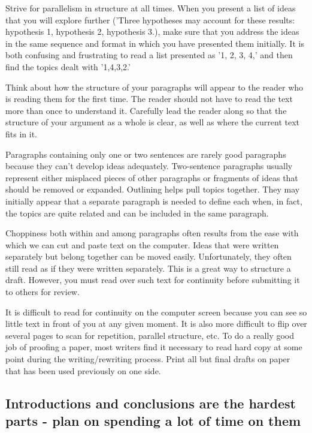 \documentclass[11pt]{article}
\begin{document}
Strive for parallelism in structure at all times. When you present a list of ideas that you will explore further ('Three hypotheses may account for these results: hypothesis 1, hypothesis 2, hypothesis 3.), make sure that you address the ideas in the same sequence and format in which you have presented them initially. It is both confusing and frustrating to read a list presented as '1, 2, 3, 4,' and then find the topics dealt with '1,4,3,2.'

Think about how the structure of your paragraphs will appear to the reader who is reading them for the first time. The reader should not have to read the text more than once to understand it. Carefully lead the reader along so that the structure of your argument as a whole is clear, as well as where the current text fits in it.

Paragraphs containing only one or two sentences are rarely good paragraphs because they can't develop ideas adequately. Two-sentence paragraphs usually represent either misplaced pieces of other paragraphs or fragments of ideas that should be removed or expanded. Outlining helps pull topics together. They may initially appear that a separate paragraph is needed to define each when, in fact, the topics are quite related and can be included in the same paragraph.

Choppiness both within and among paragraphs often results from the ease with which we can cut and paste text on the computer. Ideas that were written separately but belong together can be moved easily. Unfortunately, they often still read as if they were written separately. This is a great way to structure a draft. However, you must read over such text for continuity before submitting it to others for review.

It is difficult to read for continuity on the computer screen because you can see so little text in front of you at any given moment. It is also more difficult to flip over several pages to scan for repetition, parallel structure, etc. To do a really good job of proofing a paper, most writers find it necessary to read hard copy at some point during the writing/rewriting process. Print all but final drafts on paper that has been used previously on one side.

\subsection{Introductions and conclusions are the hardest parts - plan on spending a lot of time on them}
\end{document}
